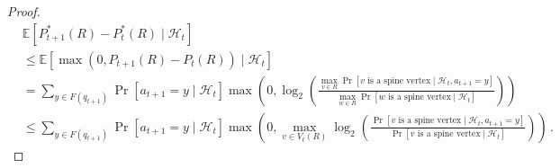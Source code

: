 \documentclass[11pt]{article}
\begin{document}
\begin{proof}
\begin{align}
    &\mathbb{E}[P^*_{t+1}(R) -P^*_t(R) \mid \mathcal{H}_t] \\
    &\leq \mathbb{E}[\max (0, P_{t+1}(R) - P_t(R)) \mid \mathcal{H}_t] \\
    &= \sum_{y \in F(q_{t+1})} \Pr \left[a_{t+1} = y \mid \mathcal{H}_t\right] \max \left(0, \log_2 \left(\frac{\max_{v \in R} \Pr[\text{$v$ is a spine vertex} \mid \mathcal{H}_t, a_{t+1} = y]}{\max_{w \in R} \Pr[\text{$w$ is a spine vertex} \mid \mathcal{H}_{t}]}\right)\right) \\
    &\leq \sum_{y \in F(q_{t+1})} \Pr \left[a_{t+1} = y \mid \mathcal{H}_t\right] \max \left(0, \max_{v \in V_t(R)} \log_2 \left(\frac{\Pr [\text{$v$ is a spine vertex} \mid \mathcal{H}_t, a_{t+1} = y]}{\Pr [\text{$v$ is a spine vertex} \mid \mathcal{H}_t]}\right)\right) \,. \label{eq:sum-f-max-log}
\end{align}


\end{proof}
\end{document}
